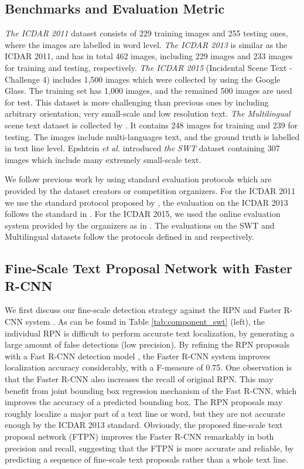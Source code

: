 \documentclass[runningheads]{llncs}
\begin{document}
\subsection{Benchmarks and Evaluation Metric} 
\textit{The ICDAR 2011} dataset \cite{Minetto2010} consists of 229 training images and 255 testing ones, where the images are labelled in word level. \textit{The ICDAR 2013 }\cite{Karatzas2013} is similar as the ICDAR 2011, and has in total 462 images, including 229 images and 233 images for training and testing, respectively.  \textit{The ICDAR 2015} (Incidental Scene Text - Challenge 4) \cite{Karatzas2015} includes 1,500 images which were collected by using the Google Glass. The training set has 1,000 images, and the remained 500 images are used for test. This dataset is more challenging than previous ones by including arbitrary orientation, very small-scale and low resolution text. \textit{The Multilingual} scene text dataset is collected by \cite{Pan2011}. It contains 248 images for training and 239 for testing. The images include multi-languages text, and the ground truth is labelled in text line level. Epshtein \textit{et al.} \cite{Epshtein2010} introduced \textit{the SWT} dataset containing 307 images which include many extremely small-scale text.

We follow previous work by using standard evaluation protocols which are provided by the dataset creators or competition organizers. For the ICDAR 2011 we use the standard protocol proposed by \cite{Wolf2006},  the evaluation on the ICDAR 2013 follows the standard in \cite{Karatzas2013}. For the ICDAR 2015, we used the online evaluation system provided by the organizers as in \cite{Karatzas2015}. The evaluations on the SWT and Multilingual datasets follow the  protocols defined in \cite{Epshtein2010} and  \cite{Pan2011} respectively.  



\subsection{Fine-Scale Text Proposal Network with Faster R-CNN}


We first discuss our fine-scale detection strategy against the RPN and Faster R-CNN system \cite{Ren2015}.  As can be found in Table \ref{tab:component_swt} (left), the individual RPN is difficult to perform accurate text localization, by generating a large amount of false detections (low precision). By refining the RPN proposals with a Fast R-CNN detection model \cite{Girshick2015}, the Faster R-CNN system improves  localization accuracy considerably, with a F-measure of 0.75.  One observation is that the Faster R-CNN also increases the recall of original RPN. This may benefit from joint bounding box regression mechanism of the Fast R-CNN, which improves the accuracy of a predicted bounding box. The RPN proposals may roughly localize a major part of a text line or word, but they are not accurate enough by the ICDAR 2013  standard. Obviously, the proposed fine-scale text proposal network (FTPN) improves the Faster R-CNN remarkably in both precision and recall, suggesting that the FTPN is more accurate and reliable,  by predicting a sequence of fine-scale text proposals rather than a whole  text line. 
\end{document}
